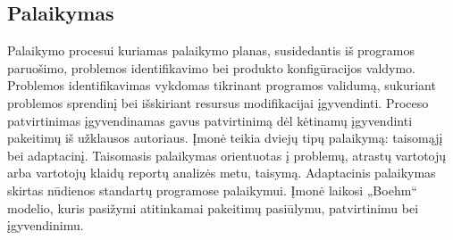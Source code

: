 \documentclass{VUMIFPSkursinis}
\begin{document}
	\subsection{Palaikymas}
	Palaikymo procesui kuriamas palaikymo planas, susidedantis iš programos paruošimo, problemos identifikavimo bei produkto konfigūracijos valdymo. Problemos identifikavimas vykdomas tikrinant programos validumą, sukuriant problemos sprendinį bei išskiriant resursus modifikacijai įgyvendinti. Proceso patvirtinimas įgyvendinamas gavus patvirtinimą dėl kėtinamų įgyvendinti pakeitimų  iš užklausos autoriaus. Įmonė teikia dviejų tipų palaikymą: taisomąjį bei adaptacinį. Taisomasis palaikymas orientuotas į problemų, atrastų vartotojų arba vartotojų klaidų reportų analizės metu, taisymą. Adaptacinis palaikymas skirtas nūdienos standartų programose palaikymui. Įmonė laikosi „Boehm“ modelio, kuris pasižymi atitinkamai pakeitimų pasiūlymu, patvirtinimu bei įgyvendinimu.
	\label{img:boehmsModel} 
\end{document}
